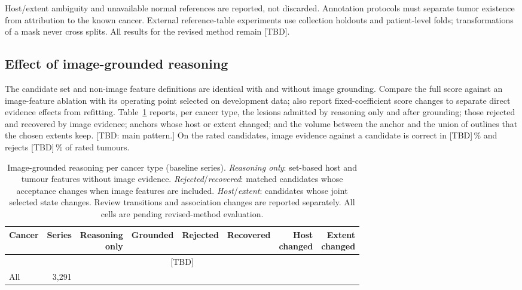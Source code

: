 \documentclass[fleqn,10pt]{olplainarticle}
\begin{document}
Host/extent ambiguity and unavailable normal references are reported, not discarded. Annotation protocols must separate
tumor existence from attribution to the known cancer. External reference-table experiments use collection holdouts and
patient-level folds; transformations of a mask never cross splits. All results for the revised method remain [TBD].

\subsection{Effect of image-grounded reasoning}
\label{sec:results_r2}
The candidate set and non-image feature definitions are identical with and without image grounding. Compare the full score
against an image-feature ablation with its operating point selected on development data; also report fixed-coefficient
score changes to separate direct evidence effects from refitting.
Table~\ref{tab:r2_by_type} reports, per cancer type, the lesions admitted by reasoning only and after grounding; those
rejected and recovered by image evidence; anchors whose host or extent changed; and the volume between the anchor and the
union of outlines that the chosen extents keep. [TBD: main pattern.] On the rated candidates, image evidence against a
candidate is correct in [TBD]\,\% and rejects [TBD]\,\% of rated tumours.

\begin{table}[t]
\centering\small
\caption{Image-grounded reasoning per cancer type (baseline series). \emph{Reasoning only}: set-based host and tumour
features without image evidence. \emph{Rejected}/\emph{recovered}: matched candidates whose acceptance changes when image
features are included. \emph{Host}/\emph{extent}: candidates whose joint selected state changes. Review transitions and
association changes are reported separately. All cells are pending revised-method evaluation.}
\label{tab:r2_by_type}
\setlength{\tabcolsep}{4pt}\footnotesize
\begin{tabular}{lrrrrrrr}
\hline
Cancer & Series & \shortstack{Reasoning\\only} & Grounded & Rejected & Recovered & \shortstack{Host\\changed} & \shortstack{Extent\\changed}\\
\hline
\multicolumn{8}{c}{[TBD]}\\
\hline
All & 3{,}291 & & & & & & \\
\hline
\end{tabular}
\end{table}
\end{document}
